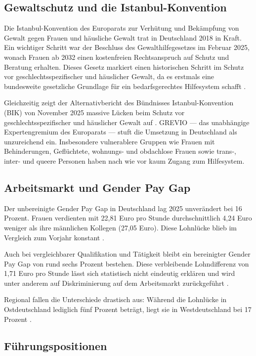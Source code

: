 \documentclass[12pt,a4paper]{article}
\begin{document}
	\subsection{Gewaltschutz und die Istanbul-Konvention}
	
	Die Istanbul-Konvention des Europarats zur Verhütung und Bekämpfung von Gewalt gegen Frauen und häusliche Gewalt trat in Deutschland 2018 in Kraft. Ein wichtiger Schritt war der Beschluss des Gewalthilfegesetzes im Februar 2025, wonach Frauen ab 2032 einen kostenfreien Rechtsanspruch auf Schutz und Beratung erhalten. Dieses Gesetz markiert einen historischen Schritt im Schutz vor geschlechtsspezifischer und häuslicher Gewalt, da es erstmals eine bundesweite gesetzliche Grundlage für ein bedarfsgerechtes Hilfesystem schafft \cite{gewalthilfegesetz}.
	
	Gleichzeitig zeigt der Alternativbericht des Bündnisses Istanbul-Konvention (BIK) von November 2025 massive Lücken beim Schutz vor geschlechtsspezifischer und häuslicher Gewalt auf \cite{bik_alternativbericht}. GREVIO — das unabhängige Expertengremium des Europarats — stuft die Umsetzung in Deutschland als unzureichend ein. Insbesondere vulnerablere Gruppen wie Frauen mit Behinderungen, Geflüchtete, wohnungs- und obdachlose Frauen sowie trans-, inter- und queere Personen haben nach wie vor kaum Zugang zum Hilfesystem.
	
	\subsection{Arbeitsmarkt und Gender Pay Gap}
	
	Der unbereinigte Gender Pay Gap in Deutschland lag 2025 unverändert bei 16 Prozent. Frauen verdienten mit 22,81 Euro pro Stunde durchschnittlich 4,24 Euro weniger als ihre männlichen Kollegen (27,05 Euro). Diese Lohnlücke blieb im Vergleich zum Vorjahr konstant \cite{gpg_2025}.
	
	Auch bei vergleichbarer Qualifikation und Tätigkeit bleibt ein bereinigter Gender Pay Gap von rund sechs Prozent bestehen. Diese verbleibende Lohndifferenz von 1,71 Euro pro Stunde lässt sich statistisch nicht eindeutig erklären und wird unter anderem auf Diskriminierung auf dem Arbeitsmarkt zurückgeführt \cite{gpg_bereinigt}.
	
	Regional fallen die Unterschiede drastisch aus: Während die Lohnlücke in Ostdeutschland lediglich fünf Prozent beträgt, liegt sie in Westdeutschland bei 17 Prozent \cite{gpg_ost_west}.
	
	\subsection{Führungspositionen}
	
\end{document}
